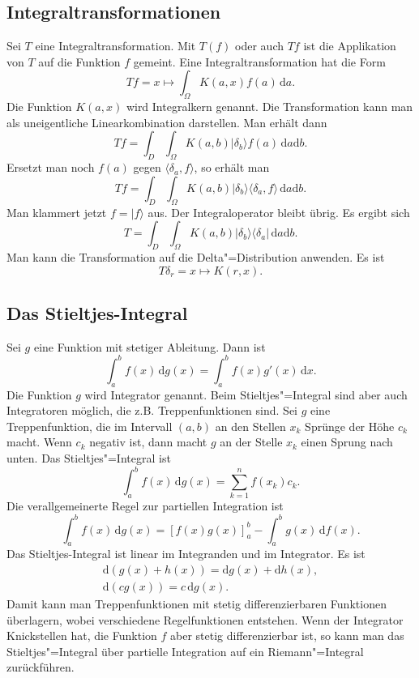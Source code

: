 \documentclass[a4paper,10pt,fleqn,twocolumn,twoside]{article}
\begin{document}
\subsection{Integraltransformationen}

Sei $T$ eine Integraltransformation. Mit $T(f)$ oder auch
$Tf$ ist die Applikation von $T$ auf die Funktion $f$ gemeint.
Eine Integraltransformation hat die Form
\[Tf = x\mapsto \int_{\Omega} K(a,x)f(a)\,\mathrm da.\]
%
Die Funktion $K(a,x)$ wird Integralkern genannt. Die Transformation
kann man als uneigentliche Linearkombination darstellen.
Man erhält dann
\[Tf = \int_{D}\int_{\Omega} K(a,b)
|\delta_b\rangle f(a)\,\mathrm da\mathrm db.\]
%
Ersetzt man noch $f(a)$ gegen $\langle\delta_a,f\rangle$,
so erhält man
\[Tf = \int_{D}\int_{\Omega} K(a,b)
|\delta_b\rangle\langle\delta_a,f\rangle\,\mathrm da\mathrm db.\]
%
Man klammert jetzt $f=|f\rangle$ aus. Der Integraloperator bleibt
übrig. Es ergibt sich
\[T = \int_{D}\int_{\Omega} K(a,b)
|\delta_b\rangle\langle\delta_a|\,\mathrm da\mathrm db.\]
%
Man kann die Transformation auf die Delta"=Distribution anwenden.
Es ist
\[T\delta_r = x\mapsto K(r,x).\]

\subsection{Das Stieltjes-Integral}

Sei $g$ eine Funktion mit stetiger Ableitung. Dann ist
\[\int_a^b f(x)\,\mathrm dg(x) = \int_a^b f(x)g'(x)\,\mathrm dx.\]
Die Funktion $g$ wird Integrator genannt. Beim Stieltjes"=Integral
sind aber auch Integratoren möglich, die z.B. Treppenfunktionen sind.
Sei $g$ eine Treppenfunktion, die im Intervall $(a,b)$ an den
Stellen $x_k$ Sprünge der Höhe $c_k$ macht. Wenn $c_k$ negativ
ist, dann macht $g$ an der Stelle $x_k$ einen Sprung nach unten.
Das Stieltjes"=Integral ist
\[\int_a^b f(x)\,\mathrm dg(x) = \sum_{k=1}^n f(x_k)c_k.\]
Die verallgemeinerte Regel zur partiellen Integration ist
\[\int_a^b f(x)\,\mathrm dg(x) = [f(x)g(x)]_a^b - \int_a^b g(x)\,\mathrm df(x).\]
Das Stieltjes-Integral ist linear im Integranden und im Integrator. Es ist
\begin{gather*}
\mathrm d(g(x)+h(x)) = \mathrm dg(x)+\mathrm dh(x),\\
\mathrm d(cg(x)) = c\,\mathrm dg(x).
\end{gather*}
Damit kann man Treppenfunktionen mit stetig differenzierbaren
Funktionen überlagern, wobei verschiedene Regelfunktionen entstehen.
Wenn der Integrator Knickstellen hat, die Funktion $f$ aber stetig
differenzierbar ist, so kann man das Stieltjes"=Integral über
partielle Integration auf ein Riemann"=Integral zurückführen.
\end{document}
